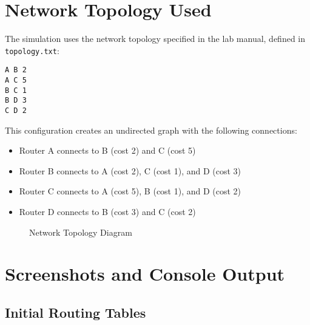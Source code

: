 \documentclass[12pt,a4paper]{article}
\begin{document}
\section{Network Topology Used}

The simulation uses the network topology specified in the lab manual, defined in \texttt{topology.txt}:

\begin{verbatim}
A B 2
A C 5
B C 1
B D 3
C D 2
\end{verbatim}

This configuration creates an undirected graph with the following connections:
\begin{itemize}
\item Router A connects to B (cost 2) and C (cost 5)
\item Router B connects to A (cost 2), C (cost 1), and D (cost 3)
\item Router C connects to A (cost 5), B (cost 1), and D (cost 2)
\item Router D connects to B (cost 3) and C (cost 2)
\end{itemize}

\begin{figure}[H]
\centering
{}
\caption{Network Topology Diagram}
\end{figure}

\section{Screenshots and Console Output}

\subsection{Initial Routing Tables}
\end{document}
